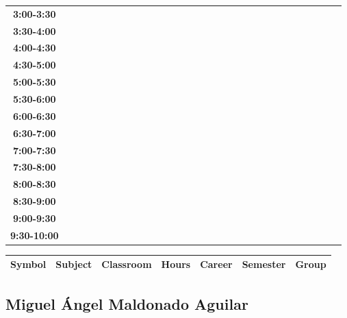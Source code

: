 \documentclass{article}
\begin{document}
\begin{table}[ht]
\begin{tabular}{|c|c|c|c|c|c|c|c|c|c|c|c|c|c|c|c|c|c|c|c|c|c|c|c|c|c|c|c|c|c|}
\textbf{3:00-3:30} &   &   &   &   &   &   &   \\
 \cline{1-8} 
\textbf{3:30-4:00} &   &   &   &   &   &   &   \\
 \cline{1-8} 
\textbf{4:00-4:30} &   &   &   &   &   &   &   \\
 \cline{1-8} 
\textbf{4:30-5:00} &   &   &   &   &   &   &   \\
 \cline{1-8} 
\textbf{5:00-5:30} &   &   &   &   &   &   &   \\
 \cline{1-8} 
\textbf{5:30-6:00} &   &   &   &   &   &   &   \\
 \cline{1-8} 
\textbf{6:00-6:30} &   &   &   &   &   &   &   \\
 \cline{1-8} 
\textbf{6:30-7:00} &   &   &   &   &   &   &   \\
 \cline{1-8} 
\textbf{7:00-7:30} &   &   &   &   &   &   &   \\
 \cline{1-8} 
\textbf{7:30-8:00} &   &   &   &   &   &   &   \\
 \cline{1-8} 
\textbf{8:00-8:30} &   &   &   &   &   &   &   \\
 \cline{1-8} 
\textbf{8:30-9:00} &   &   &   &   &   &   &   \\
 \cline{1-8} 
\textbf{9:00-9:30} &   &   &   &   &   &   &   \\
 \cline{1-8} 
\textbf{9:30-10:00} &   &   &   &   &   &   &   \\
 \cline{1-8} 
\end{tabular}\end{table}

        
        \begin{tabular}{|>{\centering\arraybackslash}m{2cm}|>{\centering\arraybackslash}m{4cm}|>{\centering\arraybackslash}m{2cm}|>{\centering\arraybackslash}m{2cm}|>{\centering\arraybackslash}m{2cm}|>{\centering\arraybackslash}m{2cm}|>{\centering\arraybackslash}m{2cm}|}
        \hline
        \textbf{Symbol} & \textbf{Subject} & \textbf{Classroom} & \textbf{Hours} & \textbf{Career} & \textbf{Semester} & \textbf{Group} \\
        \hline
        \end{tabular}
                    

        \newpage
        

        \subsection{Miguel \'Angel Maldonado Aguilar}
        \vspace*{.1cm}
        
\end{document}
